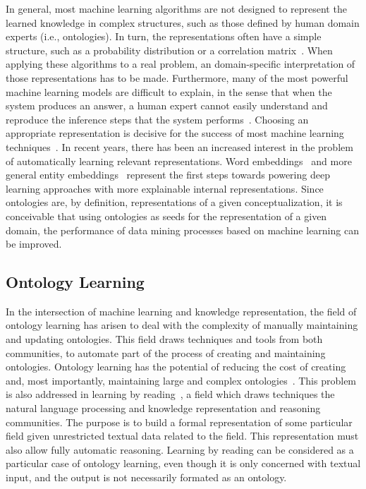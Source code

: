     In general, most machine learning algorithms are not designed to represent the learned knowledge in complex structures,
    such as those defined by human domain experts (i.e., ontologies). In turn, the representations often have a simple structure, such
 	as a probability distribution or a correlation matrix~\cite{bengio2013representation}.
    When applying these algorithms to a real problem, an domain-specific
    interpretation of those representations has to be made. 
    Furthermore, many of the most powerful machine learning models are difficult to explain, in the sense
    that when the system produces an answer, a human expert cannot easily understand and reproduce the inference steps
    that the system performs~\cite{olden2002illuminating}.
    Choosing an appropriate representation is decisive for the success of most machine learning techniques~\cite{bengio2012deep}.
    In recent years, there has been an increased interest in the problem of automatically learning relevant representations.
    Word embeddings~\cite{mikolov} and more general entity embeddings~\cite{hu2015entity} represent the first steps towards powering
    deep learning approaches with more explainable internal representations.
    Since ontologies are, by definition, representations of a given conceptualization, it is conceivable that using ontologies
    as seeds for the representation of a given domain, the performance of data mining processes based on machine learning can
    be improved.
    \subsection{Ontology Learning}

    In the intersection of machine learning and knowledge representation,
      the field of ontology learning has arisen to deal with the 
      complexity of manually maintaining and updating ontologies.
      This field draws techniques and tools from both communities, 
      to automate part of the process of creating and maintaining ontologies.
    Ontology learning has the potential of reducing the cost of creating
    and, most importantly, maintaining large and complex ontologies~\cite{cimiano2009ontology}.
      This problem is also addressed in 
      learning by reading~\cite{barker2007learning}, a field which draws techniques
    the natural language processing and knowledge representation and reasoning communities.
    The purpose is to build a formal representation of some particular field given unrestricted
    textual data related to the field. This representation must also allow fully automatic
    reasoning.    
      Learning by reading can be considered as a particular case of ontology learning,
      even though it is only concerned with textual input, and the
      output is not necessarily formated as an ontology.
      

